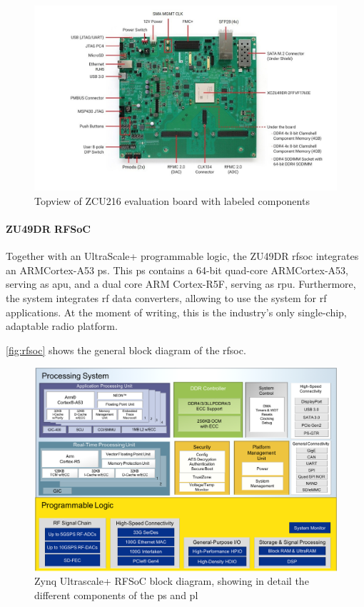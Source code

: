 \begin{figure}[tb]
	\centering
	\includegraphics[width = \textwidth]{chap/05-readout/img/zcu216}
	\caption{Topview of ZCU216 evaluation board with labeled components \cite{zcu216}}
	\label{fig:zcu216}
\end{figure}

\paragraph{ZU49DR RFSoC}
Together with an UltraScale+ programmable logic, the ZU49DR \gls{rfsoc} integrates an ARM\textregistered Cortex\texttrademark-A53 \gls{ps}. %
This \gls{ps} contains a 64-bit quad-core ARM\textregistered Cortex\texttrademark-A53, serving as \gls{apu}, and a dual core ARM Cortex-R5F, serving as \gls{rpu}.
Furthermore, the system integrates \gls{rf} data converters, allowing to use the system for \gls{rf} applications.
At the moment of writing, this is the industry's only single-chip, adaptable radio platform. \cite{zu49}

\autoref{fig:rfsoc} shows the general block diagram of the \gls{rfsoc}.

\begin{figure}[tb]
	\centering
	\includegraphics[width = \textwidth]{chap/05-readout/img/rfsoc_blockdiagram}
	\caption[Zynq Ultrascale+ RFSoC block diagram]{Zynq Ultrascale+ RFSoC block diagram, showing in detail the different components of the \gls{ps} and \gls{pl}}
	\label{fig:rfsoc}
\end{figure}


